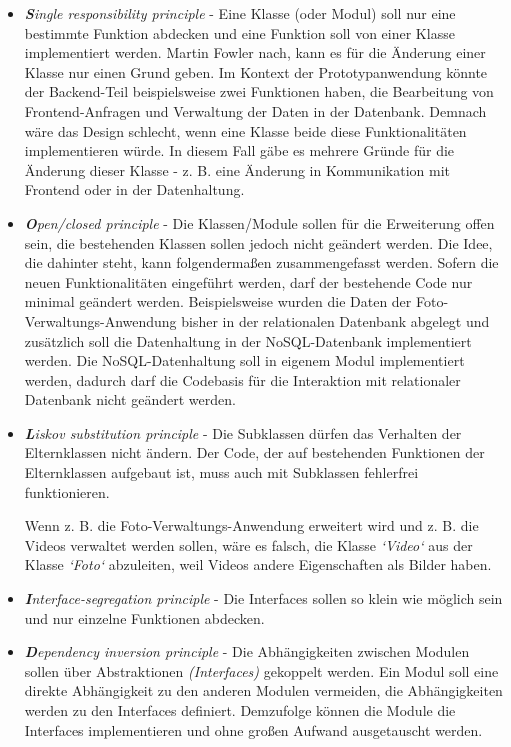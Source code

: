 \begin{itemize}

\item \textit{\textbf{S}ingle responsibility principle} - Eine Klasse (oder Modul) soll nur eine bestimmte Funktion abdecken und eine Funktion soll von einer Klasse implementiert werden. Martin Fowler \cite{MartinFowler} nach, kann es für die Änderung einer Klasse nur einen Grund geben. Im Kontext der Prototypanwendung könnte der Backend-Teil beispielsweise zwei Funktionen haben, die Bearbeitung von Frontend-Anfragen und Verwaltung der Daten in der Datenbank. Demnach wäre das Design schlecht, wenn eine Klasse beide diese Funktionalitäten implementieren würde. In diesem Fall gäbe es mehrere Gründe für die Änderung dieser Klasse - z. B. eine Änderung in Kommunikation mit Frontend oder in der Datenhaltung.

\item \textit{\textbf{O}pen/closed principle} - Die Klassen/Module sollen für die Erweiterung offen sein, die bestehenden Klassen sollen jedoch nicht geändert werden. Die Idee, die dahinter steht, kann folgendermaßen zusammengefasst werden. Sofern die neuen Funktionalitäten eingeführt werden, darf der bestehende Code nur minimal geändert werden. Beispielsweise wurden die Daten der Foto-Verwaltungs-Anwendung bisher in der relationalen Datenbank abgelegt und zusätzlich soll die Datenhaltung in der NoSQL-Datenbank implementiert werden. Die NoSQL-Datenhaltung soll in eigenem Modul implementiert werden, dadurch darf die Codebasis für die Interaktion mit relationaler Datenbank nicht geändert werden. 

\item \textit{\textbf{L}iskov substitution principle} - Die Subklassen dürfen das Verhalten der Elternklassen nicht ändern. Der Code, der auf bestehenden Funktionen der Elternklassen aufgebaut ist, muss auch mit Subklassen fehlerfrei funktionieren.

Wenn z. B. die Foto-Verwaltungs-Anwendung erweitert wird und z. B. die Videos verwaltet werden sollen, wäre es falsch, die Klasse \textit{`Video`} aus der Klasse \textit{`Foto`} abzuleiten, weil Videos andere Eigenschaften als Bilder haben.

\item \textit{\textbf{I}nterface-segregation principle} - Die Interfaces sollen so klein wie möglich sein und nur einzelne Funktionen abdecken.

\item \textit{\textbf{D}ependency inversion principle} - Die Abhängigkeiten zwischen Modulen sollen über Abstraktionen \textit{(Interfaces)} gekoppelt werden. Ein Modul soll eine direkte Abhängigkeit zu den anderen Modulen vermeiden, die Abhängigkeiten werden zu den Interfaces definiert. Demzufolge können die Module die Interfaces implementieren und ohne großen Aufwand ausgetauscht werden. 


\end{itemize}
